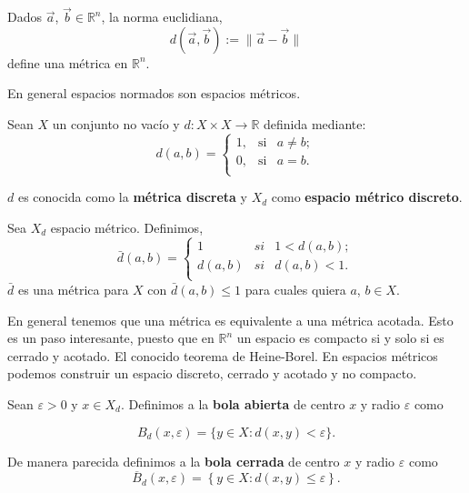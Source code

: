 \begin{ej}
 Dados $\vec{a}$, $\vec{b} \in \mathbb{R}^{n}$, la norma euclidiana,
$$d(\vec{a},\vec{b}):=\| \vec{a}-\vec{b} \|$$
define una métrica en $\mathbb{R}^{n}$.
\end{ej}

En general espacios normados son espacios métricos. 
 
\begin{ej}
Sean $X$ un conjunto no vacío y $d : X \times X \to\mathbb{R}$ definida mediante:
$$d(a,b)=\left\{
\begin{array}{lcc}
1, & \text{si} & a \neq b; \\
0, & \text{si} & a=b. \\
\end{array}
\right.$$

$d$ es conocida como la \textbf{métrica discreta} y  $X_{d}$ como \textbf{espacio métrico discreto}.
\end{ej}


\begin{ej}\label{ejem:metrica-acotada}
Sea $X_{d}$ espacio métrico. Definimos,
$$\bar{d}(a,b)=\left\{
\begin{array}{lcc}
1 & si & 1 < d(a,b);   \\
d(a,b) & si & d(a,b)<1. \\
\end{array}
\right.
$$
$\bar{d}$ es una métrica para $X$ con $\bar{d}(a,b)\leq 1$ para cuales quiera $a$, $b \in X.$ 
\end{ej}


En general tenemos que una métrica es equivalente a una métrica acotada. Esto es un paso interesante, puesto que en $\mathbb{R}^n$ un espacio es compacto si y solo si es cerrado y acotado. El conocido teorema de Heine-Borel. En espacios métricos podemos construir un espacio discreto, cerrado y acotado y no compacto. 


\label{def:top-espacios-metricos}
\begin{df}
Sean $\varepsilon > 0$ y $x\in X_d$. Definimos a la \textbf{bola abierta} de centro $x$ y radio $\varepsilon$  como

$$B_{d}(x,\varepsilon)=\{ y \in X: d(x,y)< \varepsilon \}.$$

De manera parecida definimos a la \textbf{bola cerrada} de centro $x$ y radio $\varepsilon$  como
$$\overline{B}_{d}(x,\varepsilon)=\left\lbrace y \in X: d(x,y)\leq \varepsilon \right\rbrace.$$
\end{df}

